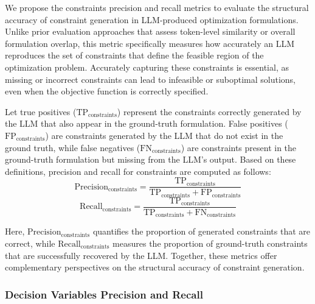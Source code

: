 \documentclass[review,12pt]{elsarticle}
\begin{document}
We propose the constraints precision and recall metrics to evaluate the structural accuracy of constraint generation in LLM-produced optimization formulations. Unlike prior evaluation approaches that assess token-level similarity or overall formulation overlap, this metric specifically measures how accurately an LLM reproduces the set of constraints that define the feasible region of the optimization problem. Accurately capturing these constraints is essential, as missing or incorrect constraints can lead to infeasible or suboptimal solutions, even when the objective function is correctly specified.

Let true positives ($\text{TP}_{\text{constraints}}$) represent the constraints correctly generated by the LLM that also appear in the ground-truth formulation. False positives ($\text{FP}_{\text{constraints}}$) are constraints generated by the LLM that do not exist in the ground truth, while false negatives ($\text{FN}_{\text{constraints}}$) are constraints present in the ground-truth formulation but missing from the LLM’s output. Based on these definitions, precision and recall for constraints are computed as follows: 
\begin{equation}
\text{Precision}_{\text{constraints}} = \frac{\text{TP}_{\text{constraints}}}{\text{TP}_{\text{constraints}} + \text{FP}_{\text{constraints}}} \label{eq:precision_constraints} 
\end{equation} 
\vspace{-5mm}
\begin{equation} 
\text{Recall}_{\text{constraints}} = \frac{\text{TP}_{\text{constraints}}}{\text{TP}_{\text{constraints}} + \text{FN}_{\text{constraints}}} \label{eq:recall_constraints} 
\end{equation} 

Here, $\text{Precision}_{\text{constraints}}$ quantifies the proportion of generated constraints that are correct, while $\text{Recall}_{\text{constraints}}$ measures the proportion of ground-truth constraints that are successfully recovered by the LLM. Together, these metrics offer complementary perspectives on the structural accuracy of constraint generation.

\subsubsection{Decision Variables Precision and Recall}\label{decision_variables}
\end{document}

